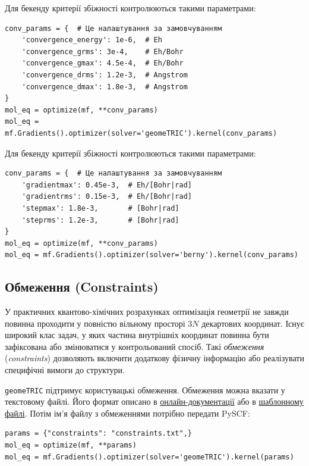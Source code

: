 Для бекенду  критерії збіжності контролюються такими параметрами:

\begin{verbatim}
conv_params = {  # Це налаштування за замовчуванням
    'convergence_energy': 1e-6,  # Eh
    'convergence_grms': 3e-4,    # Eh/Bohr
    'convergence_gmax': 4.5e-4,  # Eh/Bohr
    'convergence_drms': 1.2e-3,  # Angstrom
    'convergence_dmax': 1.8e-3,  # Angstrom
}
mol_eq = optimize(mf, **conv_params)
mol_eq = mf.Gradients().optimizer(solver='geomeTRIC').kernel(conv_params)
\end{verbatim}

Для бекенду  критерії збіжності контролюються такими параметрами:

\begin{verbatim}
conv_params = {  # Це налаштування за замовчуванням
    'gradientmax': 0.45e-3,  # Eh/[Bohr|rad]
    'gradientrms': 0.15e-3,  # Eh/[Bohr|rad]
    'stepmax': 1.8e-3,       # [Bohr|rad]
    'steprms': 1.2e-3,       # [Bohr|rad]
}
mol_eq = optimize(mf, **conv_params)
mol_eq = mf.Gradients().optimizer(solver='berny').kernel(conv_params)
\end{verbatim}

\subsection{Обмеження (Constraints)}

У практичних квантово-хімічних розрахунках оптимізація геометрії не завжди
повинна проходити у повністю вільному просторі $3N$ декартових координат.
Існує широкий клас задач, у яких частина внутрішніх координат повинна бути
зафіксована або змінюватися у контрольований спосіб. Такі \emph{обмеження}
(\textit{constraints}) дозволяють включити додаткову фізичну інформацію
або реалізувати специфічні вимоги до структури.

\texttt{geomeTRIC} підтримує користувацькі обмеження. Обмеження можна вказати у текстовому файлі. Його формат описано в \href{https://geometric.readthedocs.io/en/latest/constraints.html#input-format}{онлайн-документації} або в \href{https://github.com/leeping/geomeTRIC/blob/master/examples/constraints.txt}{шаблонному файлі}. Потім ім'я файлу з обмеженнями потрібно передати PySCF:

\begin{verbatim}
params = {"constraints": "constraints.txt",}
mol_eq = optimize(mf, **params)
mol_eq = mf.Gradients().optimizer(solver='geomeTRIC').kernel(params)
\end{verbatim}

